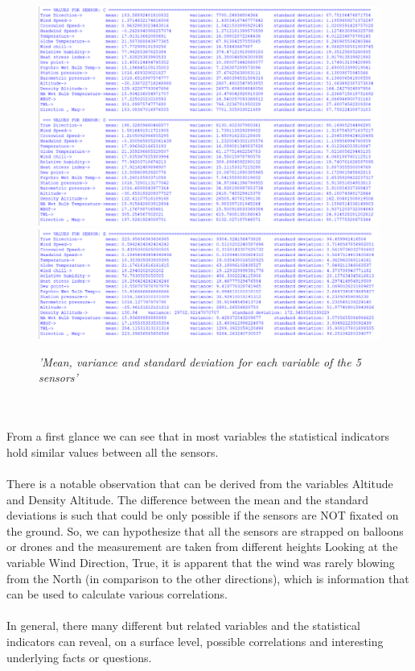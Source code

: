 \documentclass[a4paper,12pt]{article} %
\begin{document}
\begin{figure}[H]
\centering
\includegraphics[width=\textwidth]{Graphs/Statistcal Indicators CD.PNG}
\includegraphics[width=\textwidth]{Graphs/Statistcal Indicators E.PNG}
\caption{\it'Mean, variance and standard deviation for each variable of the 5 sensors'}
\end{figure}
\\\\
From a first glance we can see that in most variables the statistical indicators hold similar values between all the sensors.
\\\\
There is a notable observation that can be derived from the variables Altitude and Density Altitude. 
The difference between the mean and the standard deviations is such that could be only possible if the sensors are NOT fixated on the ground. 
So, we can hypothesize that all the sensors are strapped on balloons or drones and the measurement are taken from different heights
Looking at the variable Wind Direction, True, it is apparent that the wind was rarely blowing from the North (in comparison to the other directions),
which is information that can be used to calculate various correlations.
\\\\
In general, there many different but related variables and the statistical indicators can reveal, 
on a surface level, possible correlations and interesting underlying facts or questions.
\\\\
\end{document}
